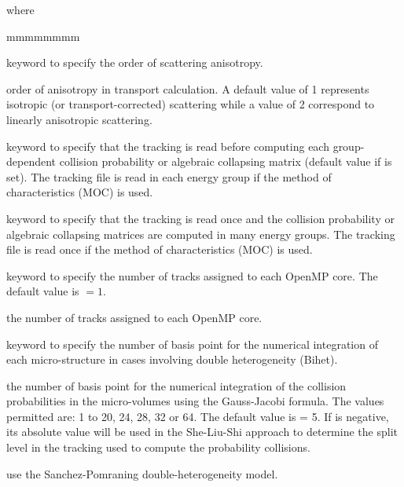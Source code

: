 \noindent
where

\begin{ListeDeDescription}{mmmmmmmm}

\item[\moc{ANIS}] keyword to specify the order of scattering anisotropy. 

\item[\dusa{nanis}] order of anisotropy in transport calculation.
A default value of 1 represents isotropic (or transport-corrected) scattering while a value of 2
correspond to linearly anisotropic scattering.

\item[\moc{ONEG}] keyword to specify that the tracking is read before computing each group-dependent collision
probability or algebraic collapsing matrix (default value if  is set). The tracking file is
read in each energy group if the method of characteristics (MOC) is used.

\item[\moc{ALLG}] keyword to specify that the tracking is read once and the collision
probability or algebraic collapsing matrices are computed in many energy groups.  The tracking file is
read once if the method of characteristics (MOC) is used.

\item[\moc{BATCH}] keyword to specify the number of tracks assigned to each OpenMP core. The default value is $=1$.

\item[\dusa{nbatch}] the number of tracks assigned to each OpenMP core.

\item[\moc{QUAB}] keyword to specify the number of basis point for the
numerical integration of each micro-structure in cases involving double
heterogeneity (Bihet).

\item[\dusa{iquab}] the number of basis point for the numerical integration of
the collision probabilities in the micro-volumes using the Gauss-Jacobi
formula. The values permitted are: 1 to 20, 24, 28, 32 or 64. The default value
is  = 5. If  is negative, its absolute value will be used in the She-Liu-Shi approach to determine the
split level in the tracking used to compute the probability collisions.

\item[\moc{SAPO}] use the Sanchez-Pomraning double-heterogeneity model.\cite{sapo}


\end{ListeDeDescription}

